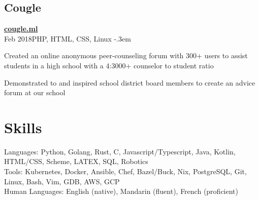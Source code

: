 \documentclass{article}
\let\olditemize=\itemize \let\endolditemize=\enditemize
\renewenvironment{itemize}{\olditemize[topsep=0em] \itemsep-.3em}{\endolditemize}
\newcommand{\link}[1]{\href{https://#1}{#1}}
\newcommand{\entry}[3]{\quad\textbf{#1}\\#2\qquad#3}
\begin{document}
\subsection{Cougle}
\entry{\link{cougle.ml}}{Feb 2018}{PHP, HTML, CSS, Linux}
\begin{itemize}
  \item Created an online anonymous peer-counseling forum with 300+ users to
    assist students in a high school with a 4:3000+ counselor to student ratio
  \item Demonstrated to and inspired school district board members to create an
    advice forum at our school
\end{itemize}

\section{Skills}
Languages:
  Python, Golang, Rust, C, Javascript/Typescript, Java, Kotlin, HTML/CSS,
  Scheme, LATEX, SQL, Robotics \\
Tools:
  Kubernetes, Docker, Ansible, Chef, Bazel/Buck, Nix, PostgreSQL, Git, Linux,
  Bash, Vim, GDB, AWS, GCP \\
Human Languages:
  English (native), Mandarin (fluent), French (proficient)
\end{document}
